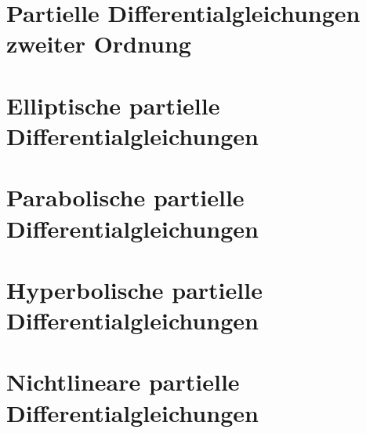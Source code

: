 \documentclass[a4paper,12pt]{book}
\begin{document}

\chapter{Partielle Differentialgleichungen zweiter Ordnung}

\chapter{Elliptische partielle Differentialgleichungen}

\chapter{Parabolische partielle Differentialgleichungen}

\chapter{Hyperbolische partielle Differentialgleichungen}

\chapter{Nichtlineare partielle Differentialgleichungen}

\end{document}
